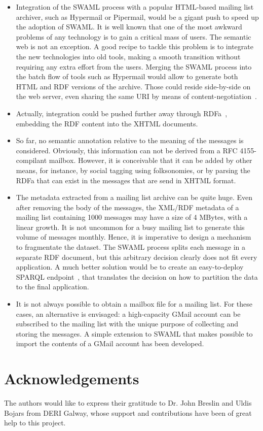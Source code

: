\documentclass{llncs}
\begin{document}
\begin{itemize}
  \item Integration of the SWAML process with a popular HTML-based
        mailing list archiver, such as Hypermail or Pipermail, would be
        a gigant push to speed up the adoption of SWAML. It is well
        known that one of the most awkward problems of any technology
        is to gain a critical mass of users. The semantic web is not
        an exception. A good recipe to tackle this problem is to
        integrate the new technologies into old tools, making
        a smooth transition without requiring any extra effort from
        the users. Merging the SWAML process into the batch flow of
        tools such as Hypermail would allow to generate both
        HTML and RDF versions of the archive. Those could reside
        side-by-side on the web server, even sharing the same URI
        by means of content-negotiation~\cite{Recipes}.
  \item Actually, integration could be pushed further away through
        RDFa~\cite{Birbeck2006}, embedding the RDF content into the
        XHTML documents.
  \item So far, no semantic annotation relative to the meaning of
        the messages is considered. Obviously, this information can not
        be derived from a RFC 4155-compilant mailbox\cite{RFC4155}.
        However, it is
        conceivable that it can be added by other means, for instance,
        by social tagging using folksonomies, or by parsing the RDFa
        that can exist in the messages that are send in XHTML format.
  \item The metadata extracted from a mailing list archive can be
        quite huge. Even after removing the body of the messages, the
        XML/RDF metadata of a mailing list containing 1000 messages may
        have a size of 4 MBytes, with a linear growth. It is not uncommon
        for a busy mailing list to generate this volume of messages
        monthly. Hence, it is imperative to design a mechanism to
        fragmentate the dataset. The SWAML process splits each message
        in a separate RDF document, but this arbitrary decision clearly
        does not fit every application. A much better solution would be to
        create an easy-to-deploy SPARQL endpoint~\cite{SPARQLProtocol},
        that translates the
        decision on how to partition the data to the final application.
  \item It is not always possible to obtain a mailbox file for a mailing
        list. For these cases, an alternative is envisaged: a high-capacity
        GMail account can be subscribed to the mailing list with the unique
        purpose of collecting and storing the messages. A simple extension
        to SWAML that makes possible to import the contents of a GMail
        account has been developed.

\end{itemize}

\section*{Acknowledgements}

The authors would like to express their gratitude to Dr. John Breslin and
Uldis Bojars from DERI Galway, whose support and contributions have been of 
great help to this project.



%
\end{document}
